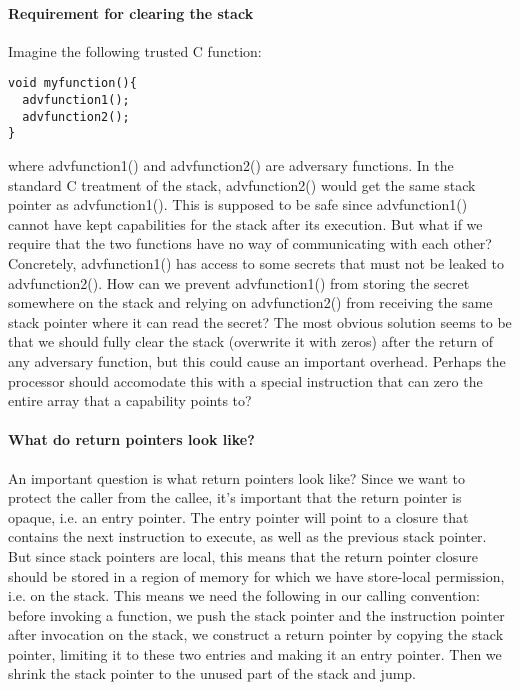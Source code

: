 \documentclass{article}
\begin{document}
\paragraph{Requirement for clearing the stack}
Imagine the following trusted C function:

\begin{verbatim}
void myfunction(){
  advfunction1();
  advfunction2();
}
\end{verbatim}

where advfunction1() and advfunction2() are adversary functions. In the standard
C treatment of the stack, advfunction2() would get the same stack pointer as
advfunction1(). This is supposed to be safe since advfunction1() cannot have
kept capabilities for the stack after its execution. But what if we require that
the two functions have no way of communicating with each other? Concretely,
advfunction1() has access to some secrets that must not be leaked to
advfunction2(). How can we prevent advfunction1() from storing the secret
somewhere on the stack and relying on advfunction2() from receiving the same
stack pointer where it can read the secret? The most obvious solution seems to
be that we should fully clear the stack (overwrite it with zeros) after the
return of any adversary function, but this could cause an important overhead.
Perhaps the processor should accomodate this with a special instruction that can
zero the entire array that a capability points to?

\paragraph{What do return pointers look like?}
An important question is what return pointers look like? Since we want to
protect the caller from the callee, it's important that the return pointer is
opaque, i.e. an entry pointer. The entry pointer will point to a closure that
contains the next instruction to execute, as well as the previous stack pointer.
But since stack pointers are local, this means that the return pointer closure
should be stored in a region of memory for which we have store-local permission,
i.e. on the stack. This means we need the following in our calling convention:
before invoking a function, we push the stack pointer and the instruction
pointer after invocation on the stack, we construct a return pointer by
copying the stack pointer, limiting it to these two entries and making it an
entry pointer.  Then we shrink the stack pointer to the unused part of the stack
and jump. 
\end{document}
